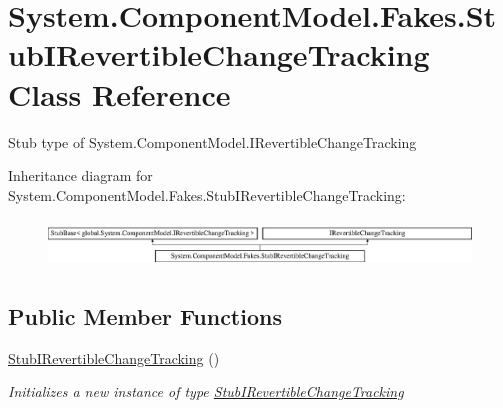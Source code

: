 \hypertarget{class_system_1_1_component_model_1_1_fakes_1_1_stub_i_revertible_change_tracking}{\section{System.\-Component\-Model.\-Fakes.\-Stub\-I\-Revertible\-Change\-Tracking Class Reference}
\label{class_system_1_1_component_model_1_1_fakes_1_1_stub_i_revertible_change_tracking}
}


Stub type of System.\-Component\-Model.\-I\-Revertible\-Change\-Tracking 


Inheritance diagram for System.\-Component\-Model.\-Fakes.\-Stub\-I\-Revertible\-Change\-Tracking\-:\begin{figure}[H]
\begin{center}
\leavevmode
\includegraphics[height=1.290323cm]{class_system_1_1_component_model_1_1_fakes_1_1_stub_i_revertible_change_tracking}
\end{center}
\end{figure}
\subsection*{Public Member Functions}
\begin{DoxyCompactItemize}
\item 
\hyperlink{class_system_1_1_component_model_1_1_fakes_1_1_stub_i_revertible_change_tracking_ac63cc7bce0a57bc932d0f24815542db0}{Stub\-I\-Revertible\-Change\-Tracking} ()
\begin{DoxyCompactList}\small\item\em Initializes a new instance of type \hyperlink{class_system_1_1_component_model_1_1_fakes_1_1_stub_i_revertible_change_tracking}{Stub\-I\-Revertible\-Change\-Tracking}\end{DoxyCompactList}\end{DoxyCompactItemize}
